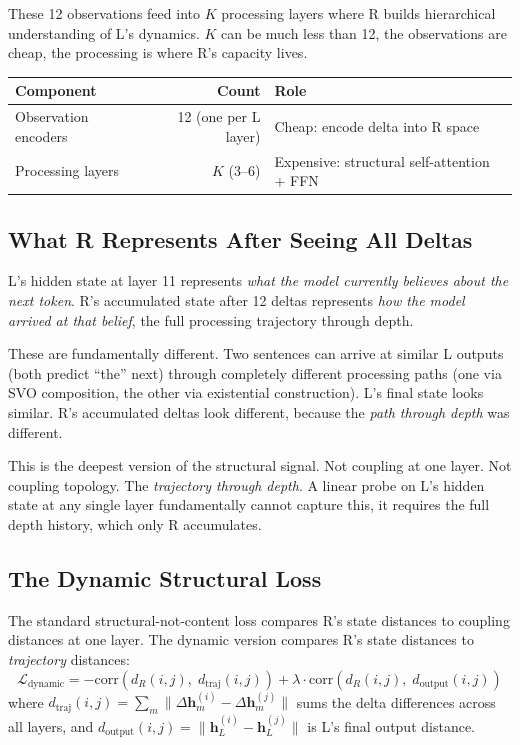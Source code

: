 \documentclass[11pt, a4paper]{article}
\newcommand{\h}{\mathbf{h}}
\theoremstyle{plain}
\theoremstyle{definition}
\theoremstyle{remark}
\begin{document}
These 12 observations feed into $K$ processing layers where R builds hierarchical understanding of L's dynamics.
$K$ can be much less than 12, the observations are cheap, the processing is where R's capacity lives.

\begin{center}\small
\begin{tabular}{lrl}
\toprule
\textbf{Component} & \textbf{Count} & \textbf{Role} \\
\midrule
Observation encoders & 12 (one per L layer) & Cheap: encode delta into R space \\
Processing layers & $K$ (3--6) & Expensive: structural self-attention + FFN \\
\bottomrule
\end{tabular}
\end{center}

\subsection{What R Represents After Seeing All Deltas}

L's hidden state at layer 11 represents \emph{what the model currently believes about the next token}.
R's accumulated state after 12 deltas represents \emph{how the model arrived at that belief}, the full processing trajectory through depth.

These are fundamentally different.
Two sentences can arrive at similar L outputs (both predict ``the'' next) through completely different processing paths (one via SVO composition, the other via existential construction).
L's final state looks similar.
R's accumulated deltas look different, because the \emph{path through depth} was different.

This is the deepest version of the structural signal.
Not coupling at one layer.
Not coupling topology.
The \emph{trajectory through depth}.
A linear probe on L's hidden state at any single layer fundamentally cannot capture this, it requires the full depth history, which only R accumulates.

\subsection{The Dynamic Structural Loss}

The standard structural-not-content loss compares R's state distances to coupling distances at one layer.
The dynamic version compares R's state distances to \emph{trajectory} distances:
\begin{equation}
\mathcal{L}_{\mathrm{dynamic}} = -\mathrm{corr}\!\left(d_R(i,j), \; d_{\mathrm{traj}}(i,j)\right) + \lambda \cdot \mathrm{corr}\!\left(d_R(i,j), \; d_{\mathrm{output}}(i,j)\right)
\end{equation}
where $d_{\mathrm{traj}}(i,j) = \sum_m \|\Delta\h_m^{(i)} - \Delta\h_m^{(j)}\|$ sums the delta differences across all layers, and $d_{\mathrm{output}}(i,j) = \|\h_{L}^{(i)} - \h_{L}^{(j)}\|$ is L's final output distance.
\end{document}
